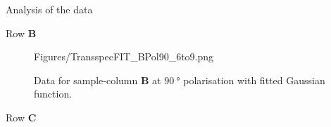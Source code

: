 \documentclass[pdftex, a4paper,11pt, twoside, UKenglish]{report}
\begin{document}
\begin{chapter}{Analysis of the data}
\begin{section}{Row \textbf{B}}
\begin{figure}[ht!]
\begin{minipage}{.95\textwidth}
              {Figures/TransspecFIT_BPol90_6to9.png}
          \caption{Data for sample-column \textbf{B} at $\SI{90}{\degree}$
              polarisation with fitted Gaussian function.}
          \label{fig:TransspecFIT_BPol90_6to9}
        \end{minipage}
      \end{figure}
      
    \end{section}
    
    
    
    \newpage
    \begin{section}{Row \textbf{C}}
      \label{chp::DataC}
      
      

\end{section}
\end{chapter}
\end{document}
